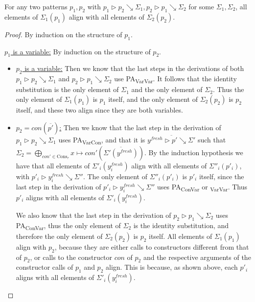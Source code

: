 \begin{lemma}
For any two patterns $p_1, p_2$ with $p_1 \rhd p_2 \searrow \Sigma_1, p_2 \rhd p_1 \searrow \Sigma_2$ for some $\Sigma_1, \Sigma_2$, all elements of $\Sigma_1(p_1)$ align with all elements of $\Sigma_2(p_2)$.

\begin{proof}
By induction on the structure of $p_1$.

\underline{$p_1$ is a variable:} By induction on the structure of $p_2$.
\begin{itemize}
\item \underline{$p_2$ is a variable:} Then we know that the last steps in the derivations of both $p_1 \rhd p_2 \searrow \Sigma_1$ and $p_2 \rhd p_1 \searrow \Sigma_2$ use PA\textsubscript{VarVar}. It follows that the identity substitution is the only element of $\Sigma_1$ and the only element of $\Sigma_2$. Thus the only element of $\Sigma_1(p_1)$ is $p_1$ itself, and the only element of $\Sigma_2(p_2)$ is $p_2$ itself, and these two align since they are both variables.

\item \underline{$p_2 = con(\overline{p'})$:} Then we know that the last step in the derivation of $p_1 \rhd p_2 \searrow \Sigma_1$ uses PA\textsubscript{VarCon}, and that it is $\overline{y^{fresh} \rhd p' \searrow \Sigma'}$ such that $\Sigma_2 = \bigoplus_{con' \in \textrm{Cons}_\tau} x \mapsto con'(\overline{\Sigma'(y^{\mathit{fresh}})})$. By the induction hypothesis we have that all elements of $\Sigma'_i(y^{fresh}_i)$ align with all elements of $\Sigma''_i(p'_i)$, with $p'_i \rhd y^{fresh}_i \searrow \Sigma''$. The only element of $\Sigma''_i(p'_i)$ is $p'_i$ itself, since the last step in the derivation of $p'_i \rhd y^{fresh}_i \searrow \Sigma''$ uses PA\textsubscript{ConVar} or \textsubscript{VarVar}. Thus $p'_i$ aligns with all elements of $\Sigma'_i(y^{fresh}_i)$.

We also know that the last step in the derivation of $p_2 \rhd p_1 \searrow \Sigma_2$ uses PA\textsubscript{ConVar}, thus the only element of $\Sigma_2$ is the identity substitution, and therefore the only element of $\Sigma_2(p_2)$ is $p_2$ itself. All elements of $\Sigma_1(p_1)$ align with $p_2$, because they are either calls to constructors different from that of $p_2$, or calls to the constructor $con$ of $p_2$ and the respective arguments of the constructor calls of $p_1$ and $p_2$ align. This is because, as shown above, each $p'_i$ aligns with all elements of $\Sigma'_i(y^{fresh}_i)$.
\end{itemize}


\end{proof}
\end{lemma}
